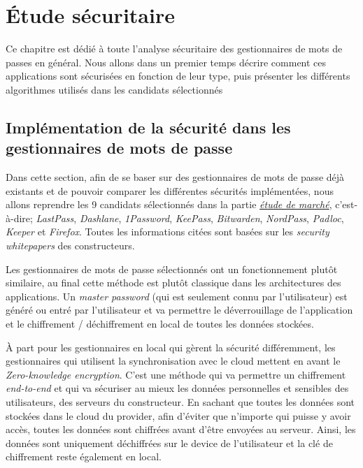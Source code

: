 
\chapter{Étude sécuritaire}
\label{ch:etude_secu}

Ce chapitre est dédié à toute l'analyse sécuritaire des gestionnaires de mots de passes en général. Nous allons dans un premier temps décrire comment ces applications sont sécurisées en fonction de leur type, puis présenter les différents algorithmes utilisés dans les candidats sélectionnés

\section{Implémentation de la sécurité dans les gestionnaires de mots de passe}

Dans cette section, afin de se baser sur des gestionnaires de mots de passe déjà existants et de pouvoir comparer les différentes sécurités implémentées, nous allons reprendre les 9 candidats sélectionnés dans la partie \hyperref[ch:etude_marche]{\textit{étude de marché}}, c'est-à-dire; \textit{LastPass}, \textit{Dashlane}, \textit{1Password}, \textit{KeePass}, \textit{Bitwarden}, \textit{NordPass}, \textit{Padloc}, \textit{Keeper} et \textit{Firefox}. Toutes les informations citées sont basées sur les \textit{security whitepapers} des constructeurs\cite{lastpasssecurity}\cite{dashlanesecurity}\cite{1passwordsecurity}\cite{keepasssecurity}\cite{bitwardensecurity}\cite{padlocsecurity}\cite{keepersecurity}\cite{nordpasssecurity}.

Les gestionnaires de mots de passe sélectionnés ont un fonctionnement plutôt similaire, au final cette méthode est plutôt classique dans les architectures des applications. Un \textit{master password} (qui est seulement connu par l'utilisateur) est généré ou entré par l'utilisateur et va permettre le déverrouillage de l'application et le chiffrement / déchiffrement en local de toutes les données stockées. 

À part pour les gestionnaires en local qui gèrent la sécurité différemment, les gestionnaires qui utilisent la synchronisation avec le cloud mettent en avant le \textit{Zero-knowledge encryption}. C'est une méthode qui va permettre un chiffrement \textit{end-to-end} et qui va sécuriser au mieux les données personnelles et sensibles des utilisateurs, des serveurs du constructeur. En sachant que toutes les données sont stockées dans le cloud du provider, afin d'éviter que n'importe qui puisse y avoir accès, toutes les données sont chiffrées avant d'être envoyées au serveur. Ainsi, les données sont uniquement déchiffrées sur le device de l'utilisateur et la clé de chiffrement reste également en local.

